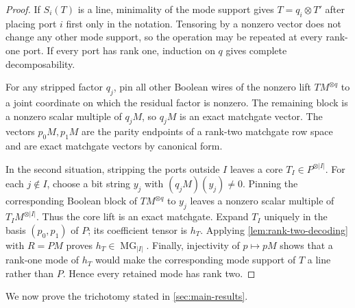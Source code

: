 \documentclass[11pt]{article}
\theoremstyle{definition}
\theoremstyle{remark}
\newcommand{\MG}{\operatorname{MG}}
\begin{document}
\begin{proof}
If $S_i(T)$ is a line, minimality of the mode support gives
$T=q_i\otimes T'$ after placing port $i$ first only in the notation.
Tensoring by a nonzero vector does not change any other mode support, so
the operation may be repeated at every rank-one port.  If every port has
rank one, induction on $q$ gives complete decomposability.

For any stripped factor $q_j$, pin all other Boolean wires of the nonzero
lift $TM^{\otimes q}$ to a joint coordinate on which the residual factor
is nonzero.  The remaining block is a nonzero scalar multiple of $q_jM$,
so $q_jM$ is an exact matchgate vector.  The vectors $p_0M,p_1M$ are the
parity endpoints of a rank-two matchgate row space and are exact matchgate
vectors by canonical form.

In the second situation, stripping the ports outside $I$ leaves a core
$T_I\in P^{\otimes|I|}$.  For each $j\notin I$, choose a bit string $y_j$
with $(q_jM)(y_j)\ne0$.  Pinning the corresponding Boolean block of
$TM^{\otimes q}$ to $y_j$ leaves a nonzero scalar multiple of
$T_IM^{\otimes|I|}$.  Thus the core lift is an exact matchgate.  Expand
$T_I$ uniquely in the basis $(p_0,p_1)$ of $P$; its coefficient tensor is
$h_T$.  Applying \cref{lem:rank-two-decoding} with $R=PM$ proves
$h_T\in\MG_{|I|}$.  Finally, injectivity of $p\mapsto pM$ shows that a
rank-one mode of $h_T$ would make the corresponding mode support of $T$ a
line rather than $P$.  Hence every retained mode has rank two.
\end{proof}

We now prove the trichotomy stated in \cref{sec:main-results}.
\end{document}
